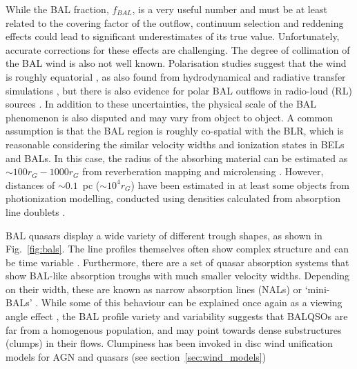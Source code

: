 While the BAL fraction, $f_{BAL}$, is a very useful number and must be at least
related to the covering factor of the outflow, continuum selection 
\citep{goodrich1997,krolikvoit1998} and reddening \citep{allen2011} effects
could lead to significant underestimates of its true value. 
Unfortunately, accurate corrections for these effects are challenging. 
The degree of collimation of the BAL wind
is also not well known. Polarisation studies suggest that the 
wind is roughly equatorial \citep{goodrich1995, cohen1995}, 
as also found from hydrodynamical and radiative transfer simulations 
\citep{PSK2000,PK04, higginbottom2013},
but there is also evidence for polar BAL outflows in 
radio-loud (RL) sources \citep{zhou2006,ghoshpunsly2007}.
In addition to these uncertainties, the physical scale of the BAL
phenomenon is also disputed and may vary from object to object.
A common assumption is that the BAL region is roughly co-spatial with
the BLR, which is reasonable considering the similar velocity widths
and ionization states in BELs and BALs. In this case, 
the radius of the absorbing material
can be estimated as $\sim 100 r_G -1000 r_G$ from reverberation mapping
and microlensing \citep[e.g., for BLRs in BALQSOs,][]{sluse2015,odowd2015}.
However, distances of  $\sim0.1$~pc ($\sim 10^4 r_G$) 
have been estimated in at least some objects from photionization modelling, 
conducted using densities calculated from absorption line doublets
\citep{borguet2013,chamberlain2015}.

BAL quasars display a wide variety of different trough shapes, 
as shown in Fig.~\ref{fig:bals}. The 
line profiles themselves often show complex structure 
\citep{foltz1987,ganguly2006, simonhamann2010} and can be time variable 
\citep{hall2011, capellupo2011,capellupo2012,capellupo2014, filizak2012}. 
Furthermore, there are a set of quasar absorption systems that show
BAL-like absorption troughs with much smaller velocity widths. Depending 
on their width, these are known as narrow absorption lines (NALs) or `mini-BALs'
\citep{misawa2007,misawa2008,nestor2008}.
While some of this behaviour can be explained once again as a viewing angle
effect \citep[e.g. ][]{ganguly2001}, the
BAL profile variety and variability suggests that BALQSOs 
are far from a homogenous population, and may point towards dense 
substructures (clumps) in their flows. Clumpiness has been invoked
in disc wind unification models for AGN and quasars
(see section~\ref{sec:wind_models})

